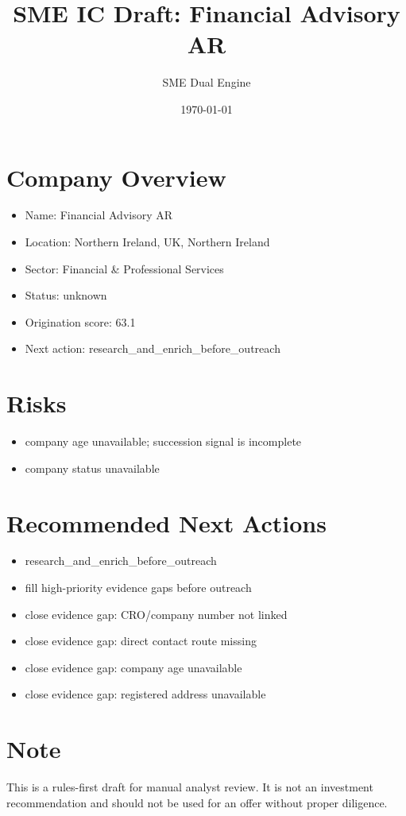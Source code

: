 \documentclass[11pt,a4paper]{article}
\title{SME IC Draft: Financial Advisory AR}
\author{SME Dual Engine}
\date{\today}
\begin{document}
\maketitle
\section*{Company Overview}
\begin{itemize}[leftmargin=1.4em]
\item Name: Financial Advisory AR
\item Location: Northern Ireland, UK, Northern Ireland
\item Sector: Financial \& Professional Services
\item Status: unknown
\item Origination score: 63.1
\item Next action: research\_and\_enrich\_before\_outreach
\end{itemize}
\section*{Risks}
\begin{itemize}[leftmargin=1.4em]
\item company age unavailable; succession signal is incomplete
\item company status unavailable
\end{itemize}
\section*{Recommended Next Actions}
\begin{itemize}[leftmargin=1.4em]
\item research\_and\_enrich\_before\_outreach
\item fill high-priority evidence gaps before outreach
\item close evidence gap: CRO/company number not linked
\item close evidence gap: direct contact route missing
\item close evidence gap: company age unavailable
\item close evidence gap: registered address unavailable
\end{itemize}
\section*{Note}
This is a rules-first draft for manual analyst review. It is not an investment
recommendation and should not be used for an offer without proper diligence.
\end{document}
